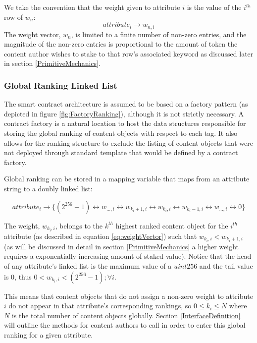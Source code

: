 We take the convention that the weight given to  attribute $i$ is the value of the $i^{th}$ row of $w_n$: 
\begin{equation}
    \label{eq:weightVector}
    attribute_i \rightarrow w_{n,i}
\end{equation}
 The weight vector, $w_n$, is limited to a finite number of non-zero entries, and the magnitude of the non-zero entries is proportional to the amount of token the content author wishes to stake to that row’s associated keyword as discussed later in section \ref{PrimitiveMechanics}. 

\subsubsection{Global Ranking Linked List}
\label{GlobalRankingDefinition}


The smart contract architecture is assumed to be based on a factory pattern (as depicted in figure \ref{fig:FactoryRanking}), although it is not strictly necessary. A contract factory is a natural location to host the data structures responsible for storing the global ranking of content objects with respect to each tag. It also allows for the ranking structure to exclude the listing of content objects that were not deployed through standard template that would be defined by a contract factory. 

Global ranking can be stored in a mapping variable that maps from an attribute string to a doubly linked list:

\begin{equation}
    attribute_i \rightarrow \{(2^{256}-1) \leftrightarrow w_{...,i} \leftrightarrow w_{k_i+1,i} \leftrightarrow w_{k_i,i} \leftrightarrow w_{k_i-1,i} \leftrightarrow w_{...,i} \leftrightarrow 0\}
\end{equation}

The weight, $w_{k_i,i}$, belongs to the $k^{th}$ highest ranked content object for the $i^{th}$ attribute (as described in equation \ref{eq:weightVector}) such that $w_{k_i,i} < w_{k_i+1,i}$ (as will be discussed in detail in section \ref{PrimitiveMechanics} a higher weight requires a exponentially increasing amount of staked value). Notice that the head of any attribute's linked list is the maximum value of a $uint256$ and the tail value is $0$, thus $0 < w_{k_i,i} < (2^{256}-1); \forall i$. 

This means that content objects that do not assign a non-zero weight to attribute $i$ do not appear in that attribute's corresponding rankings, so $0 \leq k_i \leq N$ where $N$ is the total number of content objects globally. Section \ref{InterfaceDefinition} will outline the methods for content authors to call in order to enter this global ranking for a given attribute. 

